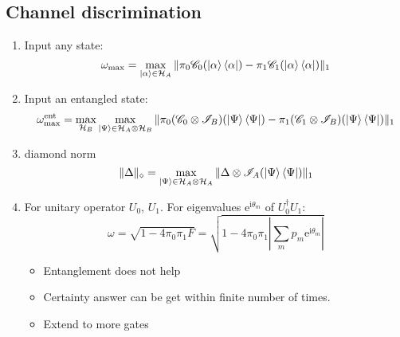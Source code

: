 \documentclass[11pt,a4paper]{article}%
\numberwithin{equation}{section}
\newcommand\mi{\mathrm{i}}
\newcommand\e{\mathrm{e}}%
\begin{document}
    \subsection{Channel discrimination} %
    \label{sub:channel_discrimination}
    \begin{enumerate}
        \item Input any state:
        \begin{equation} 
         \omega_{\mathrm{max}} = \max_{\ket\alpha\in\mathcal H_A}\Vert \pi_0\mathscr C_0(\ket\alpha\bra\alpha) - \pi_1\mathscr C_1(\ket\alpha\bra\alpha)\Vert_1
        \end{equation}
        \item Input an entangled state:
        \begin{equation}
         \omega_{\mathrm{max}}^{\mathrm{ent}} = \max_{\mathcal H_B}\max_{\ket\Psi\in\mathcal H_A\otimes \mathcal H_B}\Vert \pi_0(\mathscr C_0\otimes\mathscr I_B)(\ket\Psi\bra\Psi) - \pi_1(\mathscr C_1\otimes\mathscr I_B)(\ket\Psi\bra\Psi)\Vert_1
        \end{equation}
        \item diamond norm
        \begin{equation}
            \Vert\Delta\Vert_\diamond = \max_{\ket\Psi\in\mathcal H_A\otimes \mathcal H_A}\Vert \Delta\otimes\mathscr I_A(\ket\Psi\bra\Psi)\Vert_1
        \end{equation}
        \item For unitary operator $U_0$, $U_1$. For eigenvalues $\e^{\mi\theta_m}$ of $U_0^\dagger U_1$: 
        \begin{equation}
            \omega = \sqrt{1-4\pi_0\pi_1F} = \sqrt{1-4\pi_0\pi_1\left|\sum_mp_m\e^{\mi\theta_m}\right|}
        \end{equation}
        \begin{itemize}
            \item Entanglement does not help
            \item Certainty answer can be get within finite number of times.
            \item Extend to more gates
        \end{itemize}
    \end{enumerate}
\end{document}
